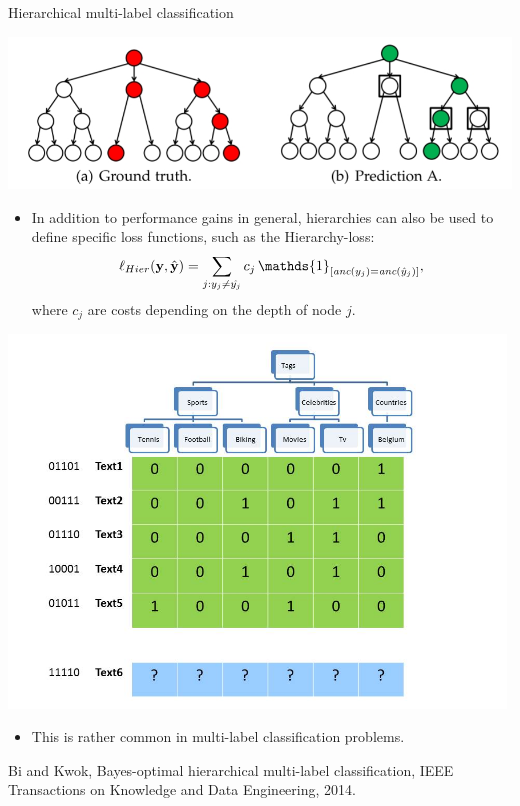 \documentclass[11pt,compress,t,notes=noshow, xcolor=table]{beamer}
\begin{document}
\begin{frame}{Hierarchical multi-label classification}
	\small
	\vspace{-0.2cm}
	\begin{center}
		\includegraphics[width=\textwidth]{figure/hloss}
	\end{center}
	
	\vspace{-0.2cm}
	\begin{minipage}{0.75\textwidth}   
	\begin{itemize}
%		
		\item %
		In addition to performance gains in general, hierarchies can also be used to define specific loss functions, such as the Hierarchy-loss: 
		$$\ell_{Hier}(\yv,\hat{\yv}) = \sum_{j: y_j \neq \hat{y_j}} c_j \, \mathds{1}_{ [\textit{anc}(y_j) = \textit{anc}(\hat{y}_j)]  },$$
		where $c_j$ are costs depending on the depth of node $j.$
%		
	\end{itemize}
\end{minipage}
\begin{minipage}{0.2\textwidth}    
	\begin{center}
		\includegraphics[width=0.99\textwidth,trim = 0 0 100 20,clip]{figure/Slide5}
	\end{center}
\end{minipage}
\begin{itemize}
%	
	\item This is rather common in multi-label classification problems.
%	
\end{itemize}

	{\tiny Bi and Kwok, Bayes-optimal hierarchical multi-label classification, IEEE Transactions on Knowledge and Data Engineering, 2014.}
%
\end{frame}
\end{document}
